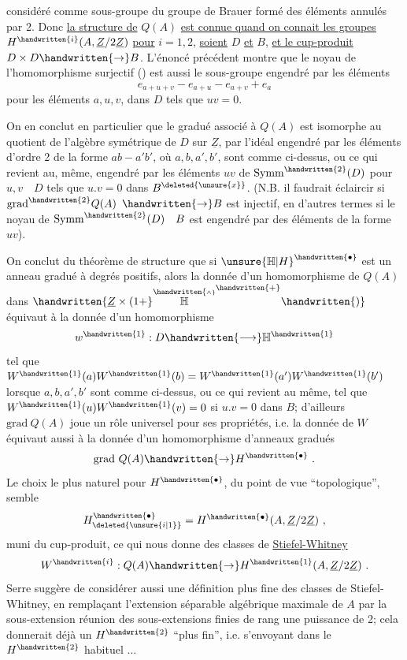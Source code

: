 considéré comme sous-groupe du groupe de Brauer formé des éléments annulés par 2. Donc \uline{la structure de} $Q(A)$ \uline{est connue quand on connait les groupes} $H^{\handwritten{i}}(A,\underline{Z}/2\underline{Z})$ \uline{pour} $i=1,2$, \uline{soient} $D$ \uline{et} $B$, \uline{et le cup-produit} $D\times D\handwritten{\to}B$. L'énoncé précédent montre  que le noyau de l'homomorphisme surjectif (\handwritten{*}) est aussi le sous-groupe engendré par les éléments
\[
e_{a+u+v}-e_{a+u}-e_{a+v}+e_a
\]
pour les éléments $a,u,v$, dans $D$ tels que $uv=0$.

On en conclut en particulier que le gradué associé à $Q(A)$ est isomorphe au quotient de l'algèbre symétrique de $D$ sur $\underline{Z}$, par  l'idéal engendré par les éléments d'ordre 2 de la forme $ab-a'b'$, où $a,b,a',b'$, sont comme ci-dessus, ou ce qui revient au, même, engendré par les éléments $uv$ de $\mathrm{Symm}^{\handwritten{2}}(D)$ pour $u,v\quad D$ tels que $u.v=0$ dans $B^{\deleted{\unsure{x}}}$. (N.B. il faudrait éclaircir si $\mathrm{grad}^{\handwritten{2}}Q(A)$  $\handwritten{\to}B$ est  injectif, en d'autres termes si le noyau de $\mathrm{Symm}^{\handwritten{2}}(D)\quad B$ est engendré par des éléments de la forme  $uv$).

On conclut du  théorème de structure que si ${\unsure{\mathbb{H}|H}}^{\handwritten{\bullet}}$ est un anneau gradué à degrés positifs, alors la donnée d'un homomorphisme  de $Q(A)$ dans $\handwritten{\underline{Z}\times(1+}\overset{\handwritten{\scriptscriptstyle\wedge}}{\mathbb{H}}^{\handwritten{+}}\handwritten{)}$ équivaut à la donnée d'un homomorphisme
\[
w^{\handwritten{1}}:D\handwritten{\longrightarrow}\mathbb{H}^{\handwritten{1}}
\]
tel que $W^{\handwritten{1}}(a)W^{\handwritten{1}}(b)=W^{\handwritten{1}}(a')W^{\handwritten{1}}(b')$ lorsque $a,b,a',b'$ sont comme ci-dessus, ou ce qui revient au même, tel que $W^{\handwritten{1}}(u)W^{\handwritten{1}}(v)=0$ si $u.v=0$ dans $B$;  d'ailleurs $\mathrm{grad}\ Q(A)$ joue un rôle universel pour ses propriétés, i.e. la donnée de $W$ équivaut aussi à la donnée d'un homomorphisme  d'anneaux gradués
\[
\mathrm{grad}\ Q(A)\handwritten{\to}H^{\handwritten{\bullet}}\ .
\]
Le choix le plus naturel pour $H^{\handwritten{\bullet}}$, du point de vue ``topologique'', semble
\[
H_{\deleted{\unsure{i|1}}}^{\handwritten{\bullet}}=H^{\handwritten{\bullet}}(A,\underline{Z}/2\underline{Z})\ ,
\]
muni du cup-produit, ce qui nous donne des classes de \uline{Stiefel-Whitney}
\[
W^{\handwritten{i}}:Q(A)\handwritten{\to}H^{\handwritten{1}}(A,\underline{Z}/2\underline{Z})\ .
\]
Serre suggère de  considérer aussi une définition plus fine des classes de Stiefel-Whitney, en remplaçant  l'extension séparable algébrique maximale de $A$ par la sous-extension réunion des sous-extensions finies de rang une puissance de 2; cela donnerait déjà un $H^{\handwritten{2}}$ ``plus fin'', i.e. s'envoyant dans le $H^{\handwritten{2}}$ habituel ...

